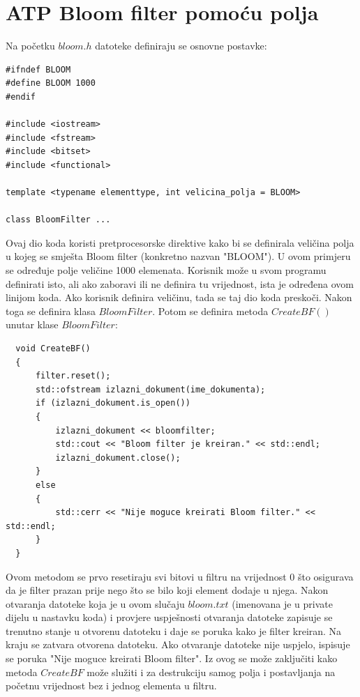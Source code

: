 \documentclass{foi}
\begin{document}
\section{ATP Bloom filter pomoću polja}

Na početku $bloom.h$ datoteke definiraju se osnovne postavke:

\begin{lstlisting}
#ifndef BLOOM
#define BLOOM 1000
#endif

#include <iostream>
#include <fstream>
#include <bitset>
#include <functional>

template <typename elementtype, int velicina_polja = BLOOM>

class BloomFilter ...
\end{lstlisting}

Ovaj dio koda koristi pretprocesorske direktive kako bi se definirala veličina polja u kojeg se smješta Bloom filter (konkretno nazvan "BLOOM"). U ovom primjeru se određuje polje veličine 1000 elemenata. Korisnik može u svom programu definirati isto, ali ako zaboravi ili ne definira tu vrijednost, ista je određena ovom linijom koda. Ako korisnik definira veličinu, tada se taj dio koda preskoči. Nakon toga se definira klasa $BloomFilter$.
\newpage
Potom se definira metoda $CreateBF()$ unutar klase $BloomFilter$:

\begin{lstlisting}
  void CreateBF()
  {
      filter.reset();
      std::ofstream izlazni_dokument(ime_dokumenta);
      if (izlazni_dokument.is_open())
      {
          izlazni_dokument << bloomfilter;
          std::cout << "Bloom filter je kreiran." << std::endl;
          izlazni_dokument.close();
      }
      else
      {
          std::cerr << "Nije moguce kreirati Bloom filter." << std::endl;
      }
  }
\end{lstlisting}

Ovom metodom se prvo resetiraju svi bitovi u filtru na vrijednost $0$ što osigurava da je filter prazan prije nego što se bilo koji element dodaje u njega. Nakon otvaranja datoteke koja je u ovom slučaju $bloom.txt$ (imenovana je u private dijelu u nastavku koda) i provjere uspješnosti otvaranja datoteke zapisuje se trenutno stanje u otvorenu datoteku i daje se poruka kako je filter kreiran. Na kraju se zatvara otvorena datoteku. Ako otvaranje datoteke nije uspjelo, ispisuje se poruka "Nije moguce kreirati Bloom filter". Iz ovog se može zaključiti kako metoda $CreateBF$ može služiti i za destrukciju samog polja i postavljanja na početnu vrijednost bez i jednog elementa u filtru.
\end{document}
